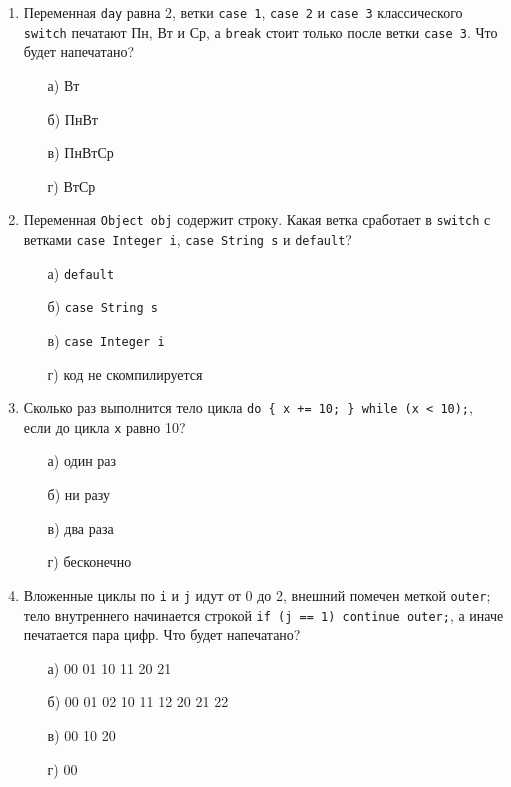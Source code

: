 \begin{enumerate}

\item Переменная \texttt{day} равна 2, ветки \texttt{case 1},
      \texttt{case 2} и \texttt{case 3} классического \texttt{switch}
      печатают Пн, Вт и Ср, а \texttt{break} стоит только после ветки
      \texttt{case 3}. Что будет напечатано?
  \begin{enumerate}
    \item[а)] Вт
    \item[б)] ПнВт
    \item[в)] ПнВтСр
    \item[г)] ВтСр
  \end{enumerate}

\item Переменная \texttt{Object obj} содержит строку. Какая ветка сработает в
      \texttt{switch} с ветками \texttt{case Integer i},
      \texttt{case String s} и \texttt{default}?
  \begin{enumerate}
    \item[а)] \texttt{default}
    \item[б)] \texttt{case String s}
    \item[в)] \texttt{case Integer i}
    \item[г)] код не скомпилируется
  \end{enumerate}

\item Сколько раз выполнится тело цикла
      \texttt{do \{ x += 10; \} while (x < 10);}, если до цикла \texttt{x}
      равно 10?
  \begin{enumerate}
    \item[а)] один раз
    \item[б)] ни разу
    \item[в)] два раза
    \item[г)] бесконечно
  \end{enumerate}

\item Вложенные циклы по \texttt{i} и \texttt{j} идут от 0 до 2, внешний
      помечен меткой \texttt{outer}; тело внутреннего начинается строкой
      \texttt{if (j == 1) continue outer;}, а иначе печатается пара цифр.
      Что будет напечатано?
  \begin{enumerate}
    \item[а)] 00 01 10 11 20 21
    \item[б)] 00 01 02 10 11 12 20 21 22
    \item[в)] 00 10 20
    \item[г)] 00
  \end{enumerate}


\end{enumerate}
